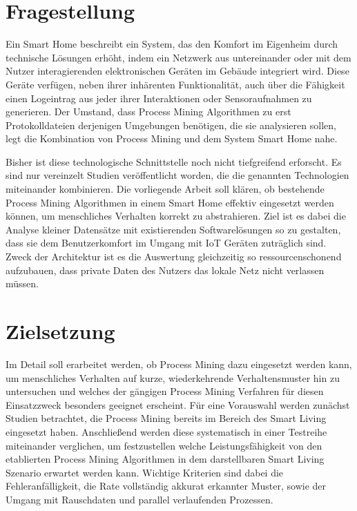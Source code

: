\section{Fragestellung}
Ein Smart Home beschreibt ein System, das den Komfort im Eigenheim durch technische Lösungen erhöht, indem ein Netzwerk aus untereinander oder mit dem Nutzer interagierenden elektronischen Geräten im Gebäude integriert wird. Diese Geräte verfügen, neben ihrer inhärenten Funktionalität, auch über die Fähigkeit einen Logeintrag aus jeder ihrer Interaktionen oder Sensoraufnahmen zu generieren. Der Umstand, dass Process Mining Algorithmen zu erst Protokolldateien derjenigen Umgebungen benötigen, die sie analysieren sollen, legt die Kombination von Process Mining und dem System Smart Home nahe.
 
Bisher ist diese technologische Schnittstelle noch nicht tiefgreifend erforscht. Es sind nur vereinzelt Studien veröffentlicht worden, die die genannten Technologien miteinander kombinieren. Die vorliegende Arbeit soll klären, ob bestehende Process Mining Algorithmen in einem Smart Home effektiv eingesetzt werden können, um menschliches Verhalten korrekt zu abstrahieren. Ziel ist es dabei die Analyse kleiner Datensätze mit existierenden Softwarelösungen so zu gestalten, dass sie dem Benutzerkomfort im Umgang mit IoT Geräten zuträglich sind. Zweck der Architektur ist es die Auswertung gleichzeitig so ressourcenschonend aufzubauen, dass private Daten des Nutzers das lokale Netz nicht verlassen müssen.

\section{Zielsetzung}
Im Detail soll erarbeitet werden, ob Process Mining dazu eingesetzt werden kann, um menschliches Verhalten auf kurze, wiederkehrende Verhaltensmuster hin zu untersuchen und welches der gängigen Process Mining Verfahren für diesen Einsatzzweck besonders geeignet erscheint. Für eine Vorauswahl werden zunächst Studien betrachtet, die Process Mining bereits im Bereich des Smart Living eingesetzt haben. Anschließend werden diese systematisch in einer Testreihe miteinander verglichen, um festzustellen welche Leistungsfähigkeit von den etablierten Process Mining Algorithmen in dem darstellbaren Smart Living Szenario erwartet werden kann. Wichtige Kriterien sind dabei die Fehleranfälligkeit, die Rate vollständig akkurat erkannter Muster, sowie der Umgang mit Rauschdaten und parallel verlaufenden Prozessen.

